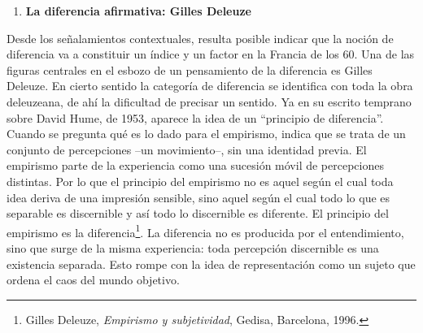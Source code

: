 \documentclass{book}
\begin{document}
\begin{enumerate}
\def\labelenumi{\arabic{enumi}.}
\setcounter{enumi}{2}
\item
  \textbf{La diferencia afirmativa: Gilles Deleuze}
\end{enumerate}

Desde los señalamientos contextuales, resulta posible indicar que la
noción de diferencia va a constituir un índice y un factor en la Francia
de los 60. Una de las figuras centrales en el esbozo de un pensamiento
de la diferencia es Gilles Deleuze. En cierto sentido la categoría de
diferencia se identifica con toda la obra deleuzeana, de ahí la
dificultad de precisar un sentido. Ya en su escrito temprano sobre David
Hume, de 1953, aparece la idea de un \enquote{principio de diferencia}. Cuando
se pregunta qué es lo dado para el empirismo, indica que se trata de un
conjunto de percepciones --un movimiento--, sin una identidad previa. El
empirismo parte de la experiencia como una sucesión móvil de
percepciones distintas. Por lo que el principio del empirismo no es
aquel según el cual toda idea deriva de una impresión sensible, sino
aquel según el cual todo lo que es separable es discernible y así todo
lo discernible es diferente. El principio del empirismo es la
diferencia\footnote{Gilles Deleuze, \emph{Empirismo y subjetividad},
  Gedisa, Barcelona, 1996.}. La diferencia no es producida por el
entendimiento, sino que surge de la misma experiencia: toda percepción
discernible es una existencia separada. Esto rompe con la idea de
representación como un sujeto que ordena el caos del mundo objetivo.
\end{document}
